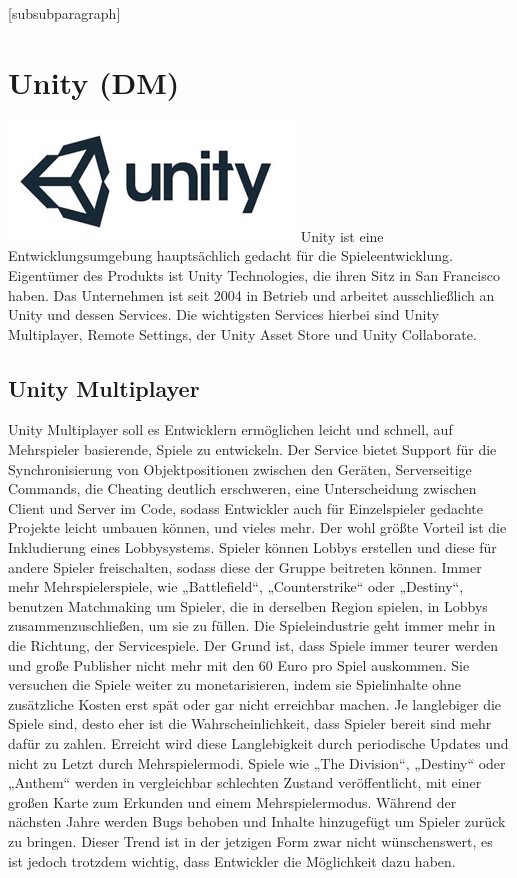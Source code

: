\setcounter{tocdepth}{4}
\setcounter{secnumdepth}{4}
[subsubparagraph]
\section{Unity (DM)}
\includegraphics{images/unityLogo.png} \cite{noauthor_unitylogo_nodate}
\newline
Unity ist eine Entwicklungsumgebung hauptsächlich gedacht für die Spieleentwicklung. Eigentümer des Produkts ist Unity Technologies, die ihren Sitz in San Francisco haben. 
Das Unternehmen ist seit 2004 in Betrieb und arbeitet ausschließlich an Unity und dessen Services. Die wichtigsten Services hierbei sind Unity Multiplayer, Remote Settings, der Unity Asset Store und Unity Collaborate. 

\subsection{Unity Multiplayer}
Unity Multiplayer soll es Entwicklern ermöglichen leicht und schnell, auf Mehrspieler basierende, Spiele zu entwickeln. Der Service bietet Support für die Synchronisierung von Objektpositionen zwischen den Geräten, Serverseitige Commands, die Cheating deutlich erschweren, eine Unterscheidung zwischen Client und Server im Code, sodass Entwickler auch für Einzelspieler gedachte Projekte leicht umbauen können, und vieles mehr. Der wohl größte Vorteil ist die Inkludierung eines Lobbysystems. Spieler können Lobbys erstellen und diese für andere Spieler freischalten, sodass diese der Gruppe beitreten können. Immer mehr Mehrspielerspiele, wie „Battlefield“, „Counterstrike“ oder „Destiny“, benutzen Matchmaking um Spieler, die in derselben Region spielen, in Lobbys zusammenzuschließen, um sie zu füllen. Die Spieleindustrie geht immer mehr in die Richtung, der Servicespiele. Der Grund ist, dass Spiele immer teurer werden und große Publisher nicht mehr mit den 60 Euro pro Spiel auskommen. Sie versuchen die Spiele weiter zu monetarisieren, indem sie Spielinhalte ohne zusätzliche Kosten erst spät oder gar nicht erreichbar machen. Je langlebiger die Spiele sind, desto eher ist die Wahrscheinlichkeit, dass Spieler bereit sind mehr dafür zu zahlen. Erreicht wird diese Langlebigkeit durch periodische Updates und nicht zu Letzt durch Mehrspielermodi. Spiele wie „The Division“, „Destiny“ oder „Anthem“ werden in vergleichbar schlechten Zustand veröffentlicht, mit einer großen Karte zum Erkunden und einem Mehrspielermodus. Während der nächsten Jahre werden Bugs behoben und Inhalte hinzugefügt um Spieler zurück zu bringen. Dieser Trend ist in der jetzigen Form zwar nicht wünschenswert, es ist jedoch trotzdem wichtig, dass Entwickler die Möglichkeit dazu haben. 

